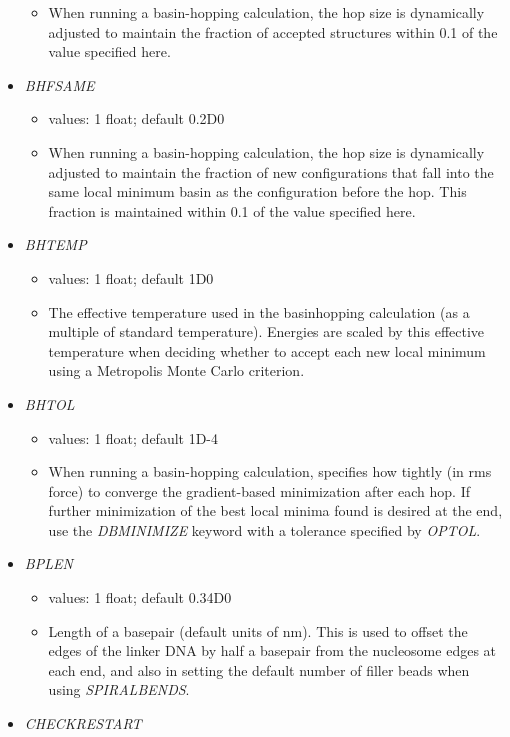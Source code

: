 \documentclass[12pt,dvips]{article}
\begin{document}
\begin{itemize}
\begin{itemize}
    \item When running a basin-hopping calculation, the hop size is dynamically adjusted to maintain the fraction of accepted structures within 0.1 of the value specified here.
  \end{itemize}
%
\item {\it BHFSAME}
  \begin{itemize}
    \item values: 1 float; default 0.2D0
    \item When running a basin-hopping calculation, the hop size is dynamically adjusted to maintain the fraction of new configurations that fall into the same local minimum basin as the configuration before the hop. This fraction is maintained within 0.1 of the value specified here.
  \end{itemize}
%
\item {\it BHTEMP}
  \begin{itemize}
    \item values: 1 float; default 1D0
    \item The effective temperature used in the basinhopping
      calculation (as a multiple of standard temperature). Energies are scaled by this effective temperature when deciding whether to accept each new local minimum using a Metropolis Monte Carlo criterion.
  \end{itemize}
% 
\item {\it BHTOL}
  \begin{itemize}
    \item values: 1 float; default 1D-4
    \item When running a basin-hopping calculation, specifies how tightly (in rms force) to converge the gradient-based minimization after each hop. If further minimization of the best local minima found is desired at the end, use the {\em DBMINIMIZE} keyword with a tolerance specified by {\em OPTOL}.
  \end{itemize}
%
\item {\it BPLEN}
  \begin{itemize}
    \item values: 1 float; default 0.34D0
    \item Length of a basepair (default units of nm). This is used to offset the edges of the linker DNA by half a basepair from the nucleosome edges at each end, and also in setting the default number of filler beads when using {\em SPIRALBENDS}.
  \end{itemize}
%
\item {\it CHECKRESTART}

\end{itemize}
\end{document}
